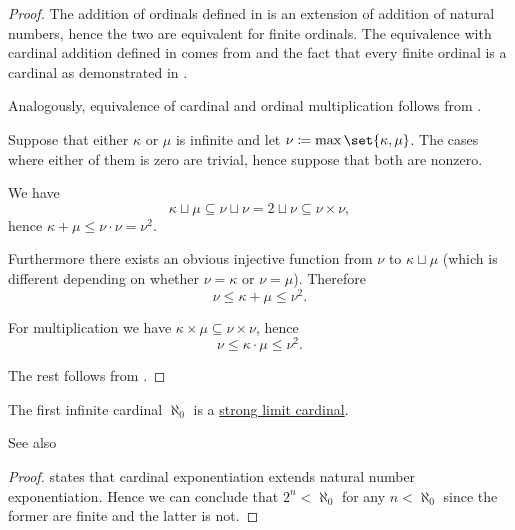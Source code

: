 \begin{proof}
   The addition of ordinals defined in  is an extension of addition of natural numbers, hence the two are equivalent for finite ordinals. The equivalence with cardinal addition defined in  comes from  and the fact that every finite ordinal is a cardinal as demonstrated in .

  Analogously, equivalence of cardinal and ordinal multiplication follows from .

   Suppose that either \( \kappa \) or \( \mu \) is infinite and let \( \nu \coloneqq \max\set{ \kappa, \mu } \). The cases where either of them is zero are trivial, hence suppose that both are nonzero.

  We have
  \begin{equation*}
    \kappa \sqcup \mu \subseteq \nu \sqcup \nu = 2 \sqcup \nu \subseteq \nu \times \nu,
  \end{equation*}
  hence \( \kappa + \mu \leq \nu \cdot \nu = \nu^2 \).

  Furthermore there exists an obvious injective function from \( \nu \) to \( \kappa \sqcup \mu \) (which is different depending on whether \( \nu = \kappa \) or \( \nu = \mu \)). Therefore
  \begin{equation*}
    \nu \leq \kappa + \mu \leq \nu^2.
  \end{equation*}

  For multiplication we have \( \kappa \times \mu \subseteq \nu \times \nu \), hence
  \begin{equation*}
    \nu \leq \kappa \cdot \mu \leq \nu^2.
  \end{equation*}

  The rest follows from .
\end{proof}

\begin{corollary}\label{thm:aleph_zero_is_strong_limit}
  The first infinite cardinal \( \aleph_0 \) is a \hyperref[def:successor_and_limit_cardinal/strong_limit]{strong limit cardinal}.

  See also 
\end{corollary}
\begin{proof}
   states that cardinal exponentiation extends natural number exponentiation. Hence we can conclude that \( 2^n < \aleph_0 \) for any \( n < \aleph_0 \) since the former are finite and the latter is not.
\end{proof}

